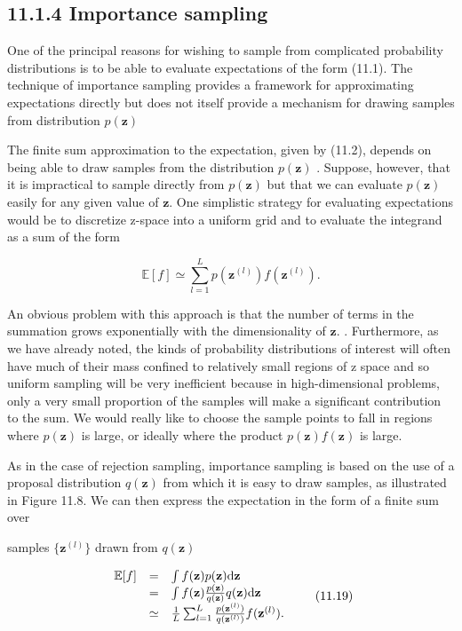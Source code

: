 \documentclass[
  10
]{article}
\begin{document}
\subsection{11.1.4 Importance sampling}\label{importance-sampling}

One of the principal reasons for wishing to sample from complicated
probability distributions is to be able to evaluate expectations of the
form (11.1). The technique of importance sampling provides a framework
for approximating expectations directly but does not itself provide a
mechanism for drawing samples from distribution \(p ( \mathbf { z } )\)

The finite sum approximation to the expectation, given by (11.2),
depends on being able to draw samples from the distribution
\(p ( \mathbf { z } )\) . Suppose, however, that it is impractical to
sample directly from \(p ( \mathbf { z } )\) but that we can evaluate
\(p ( \mathbf { z } )\) easily for any given value of
\(\mathbf { z } .\) One simplistic strategy for evaluating expectations
would be to discretize z-space into a uniform grid and to evaluate the
integrand as a sum of the form

\[
\mathbb {E} [ f ] \simeq \sum_ {l = 1} ^ {L} p (\mathbf {z} ^ {(l)}) f (\mathbf {z} ^ {(l)}).\tag{11.18}
\]

An obvious problem with this approach is that the number of terms in the
summation grows exponentially with the dimensionality of
\(\mathbf { z } .\) . Furthermore, as we have already noted, the kinds
of probability distributions of interest will often have much of their
mass confined to relatively small regions of z space and so uniform
sampling will be very inefficient because in high-dimensional problems,
only a very small proportion of the samples will make a significant
contribution to the sum. We would really like to choose the sample
points to fall in regions where \(p ( \mathbf { z } )\) is large, or
ideally where the product \(p ( \mathbf { z } ) f ( \mathbf { z } )\) is
large.

As in the case of rejection sampling, importance sampling is based on
the use of a proposal distribution \(q ( \mathbf { z } )\) from which it
is easy to draw samples, as illustrated in Figure 11.8. We can then
express the expectation in the form of a finite sum over

samples \(\{ \mathbf { z } ^ { ( l ) } \}\) drawn from
\(q ( \mathbf { z } )\)

\[
\begin{array}{r c l} \mathbb {E} [ f ] & = & \int f (\mathbf {z}) p (\mathbf {z})   \mathrm{d} \mathbf {z} \\ & = & \int f (\mathbf {z}) \frac {p (\mathbf {z})}{q (\mathbf {z})} q (\mathbf {z})   \mathrm{d} \mathbf {z} \\ & \simeq & \frac {1}{L} \sum_ {l = 1} ^ {L} \frac {p (\mathbf {z} ^ {(l)})}{q (\mathbf {z} ^ {(l)})} f (\mathbf {z} ^ {(l)}). \end{array}\tag{11.19}
\]
\end{document}
